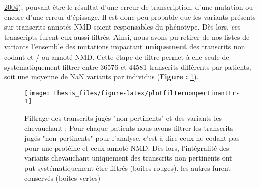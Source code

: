\documentclass[12pt,twoside]{reedthesis}
\theoremstyle{definition}
\theoremstyle{definition}
\theoremstyle{remark}
\begin{document}
\begin{enumerate}
    \protect\hyperlink{ref-Baker2004}{2004}), pouvant être le résultat
    d'une erreur de transcription, d'une mutation ou encore d'une erreur
    d'épissage. Il est donc peu probable que les variants présents sur
    transcrits annotés NMD soient responsables du phénotype. Dès lors, ces
    transcripts furent eux aussi filtrés. Ainsi, nous avons pu retirer de
    nos listes de variants l'ensemble des mutations impactant
    \textbf{uniquement} des transcrits non codant et / ou annoté NMD.
    Cette étape de filtre permet à elle seule de systematiquement filtrer
    entre 36576 et 44581 transcrits différents par patients, soit une
    moyenne de NaN variants par individus (\textbf{Figure :
    }\ref{fig:plotfilternonpertinanttr}).
  \end{enumerate}
  
  \begin{figure}
  
  {\centering \texttt{[image: thesis\_files/figure-latex/plotfilternonpertinanttr-1]} 
  
  }
  
  \caption[Filtrage des transcrits jugés "non pertinents" et des variants les chevauchant]{Filtrage des transcrits jugés "non pertinents" et des variants les chevauchant : Pour chaque patients nous avons filtrer les transcrits jugés "non pertinents" pour l'analyse, c'est à dire ceux ne codant pas pour une protéine et ceux annoté NMD. Dès lors, l'intégralité des variants chevauchant uniquement des transcrits non pertinents ont put systématiquement être filtrés (boites rouges). les autres furent conservés (boites vertes)}\label{fig:plotfilternonpertinanttr}
  \end{figure}
  
\end{document}
